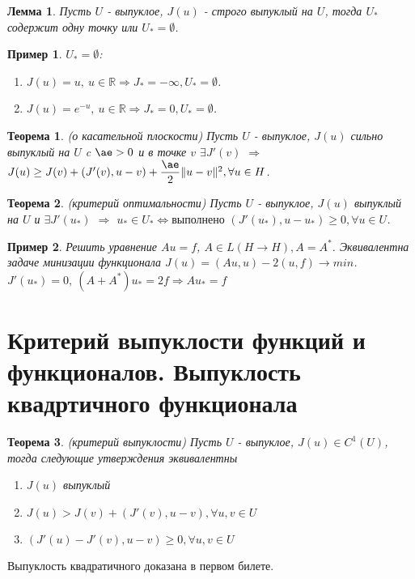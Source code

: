 \documentclass[9pt, a4paper]{extarticle}
\newtheorem*{theorem}{Теорема}
\newtheorem*{lemma}{Лемма}
\newtheorem*{sample}{Пример}
\begin{document}
	\begin{lemma}
			Пусть $U$ - выпуклое, $J(u)$ - строго выпуклый на $U$, тогда $U_*$ содержит одну точку или $U_* = \emptyset$.
	\end{lemma}
	\begin{sample}
		$U_* = \emptyset$: \newline
		\begin{enumerate}
			\item $J(u) = u, \ u \in \mathbb{R} \Rightarrow J_* = - \infty, U_* = \emptyset$.
			\item $J(u) = e^{-u}, \ u \in \mathbb{R} \Rightarrow J_* = 0, U_* = \emptyset$.
		\end{enumerate}
	\end{sample}
	\begin{theorem}
		(о касательной плоскости)\newline
		Пусть $U$ - выпуклое, $J(u)$ сильно выпуклый на $U$ c $\ae > 0$ и в точке $v$ $\exists J'(v)$ $\Rightarrow$ $J(u) \geq J(v) + (J'(v), u - v) + \dfrac\ae2 \|u-v\|^2, \forall u \in H$. 
	\end{theorem}
	\begin{theorem}
		(критерий оптимальности)\newline
		Пусть $U$ - выпуклое, $J(u)$ выпуклый на $U$ и $\exists J'(u_*)$ $\Rightarrow$ $u_* \in U_* \Leftrightarrow \text{выполнено } (J'(u_*), u -u_*) \geq 0, \forall u \in U$. 
	\end{theorem}
	\begin{sample}
		Решить уравнение $Au = f$, $A \in L(H \to H), A = A^*$. Эквивалентна задаче минизации функционала  $J(u) = (Au, u) - 2(u,f) \to min$. $J'(u_*) = 0, \ (A + A^*) u_* = 2f \Rightarrow Au_* = f$
	\end{sample}
\section{Критерий выпуклости функций и функционалов. Выпуклость квадртичного функционала}
	\begin{theorem}
		(критерий выпуклости)\newline
		Пусть $U$ - выпуклое, $J(u) \in C^1(U)$, тогда следующие утверждения эквивалентны
		\begin{enumerate}
			\item $J(u)$ выпуклый
			\item $J(u) > J(v) + (J'(v), u - v), \forall u,v \in U$
			\item $(J'(u) - J'(v), u-v) \geq 0, \forall u, v \in U$
		\end{enumerate}
	\end{theorem}
	Выпуклость квадратичного доказана в первом билете. 
\end{document}
